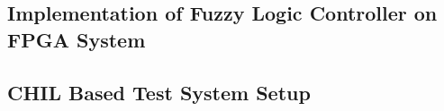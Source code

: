 \subsection{Implementation of Fuzzy Logic Controller on FPGA System}

\subsection{CHIL Based Test System Setup}
